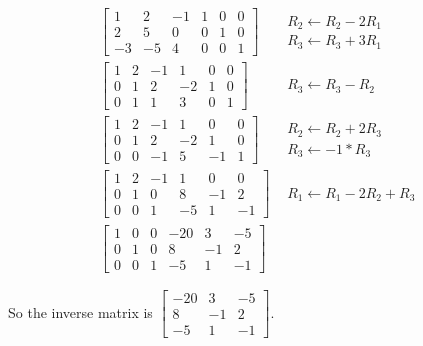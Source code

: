\documentclass{article}
\begin{document}
\begin{align}
 \begin{bmatrix}
  1 & 2 & -1 & 1 & 0 & 0 \\
  2 & 5 & 0 & 0 & 1 & 0 \\
  -3 & -5 & 4 & 0 & 0 & 1
 \end{bmatrix}&
 \begin{array}{l}
  R_2 \leftarrow R_2 - 2R_1 \\
  R_3 \leftarrow R_3 + 3R_1
 \end{array}
 \nonumber \\
 \begin{bmatrix}
  1 & 2 & -1 & 1 & 0 & 0 \\
  0 & 1 & 2 & -2 & 1 & 0 \\
  0 & 1 & 1 & 3 & 0 & 1
 \end{bmatrix}&
 \begin{array}{l}
  R_3 \leftarrow R_3 - R_2
 \end{array}
 \nonumber \\
 \begin{bmatrix}
  1 & 2 & -1 & 1 & 0 & 0 \\
  0 & 1 & 2 & -2 & 1 & 0 \\
  0 & 0 & -1 & 5 & -1 & 1
 \end{bmatrix}&
 \begin{array}{l}
  R_2 \leftarrow R_2 + 2R_3 \\
  R_3 \leftarrow -1 * R_3
 \end{array}
 \nonumber \\
 \begin{bmatrix}
  1 & 2 & -1 & 1 & 0 & 0 \\
  0 & 1 & 0 & 8 & -1 & 2 \\
  0 & 0 & 1 & -5 & 1 & -1
 \end{bmatrix}&
 \begin{array}{l}
  R_1 \leftarrow R_1 - 2R_2 + R_3
 \end{array}
 \nonumber \\
 \begin{bmatrix}
  1 & 0 & 0 & -20 & 3 & -5 \\
  0 & 1 & 0 & 8 & -1 & 2 \\
  0 & 0 & 1 & -5 & 1 & -1
 \end{bmatrix}
 \nonumber
\end{align}

So the inverse matrix is
\(\begin{bmatrix} -20 & 3 & -5 \\ 8 & -1 & 2 \\ -5 & 1 & -1 \end{bmatrix}\).
\end{document}
